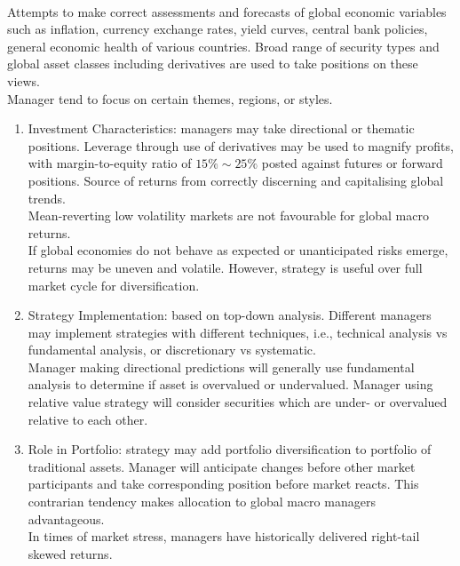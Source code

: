 \begin{remark} \\
Attempts to make correct assessments and forecasts of global economic variables such as inflation, currency exchange rates, yield curves, central bank policies, general economic health of various countries. Broad range of security types and global asset classes including derivatives are used to take positions on these views.\\
Manager tend to focus on certain themes, regions, or styles.
\begin{enumerate}[label=\roman*.]
\setlength{\itemsep}{0pt}
\item Investment Characteristics: managers may take directional or thematic positions. Leverage through use of derivatives may be used to magnify profits, with margin-to-equity ratio of $15\% \sim 25\%$ posted against futures or forward positions. Source of returns from correctly discerning and capitalising global trends.\\
Mean-reverting low volatility markets are not favourable for global macro returns.\\
If global economies do not behave as expected or unanticipated risks emerge, returns may be uneven and volatile. However, strategy is useful over full market cycle for diversification.
\item Strategy Implementation: based on top-down analysis. Different managers may implement strategies with different techniques, i.e., technical analysis vs fundamental analysis, or discretionary vs systematic.\\
Manager making directional predictions will generally use fundamental analysis to determine if asset is overvalued or undervalued. Manager using relative value strategy will consider securities which are under- or overvalued relative to each other.
\item Role in Portfolio: strategy may add portfolio diversification to portfolio of traditional assets. Manager will anticipate changes before other market participants and take corresponding position before market reacts. This contrarian tendency makes allocation to global macro managers advantageous.\\
In times of market stress, managers have historically delivered right-tail skewed returns.
\end{enumerate}
\end{remark}

